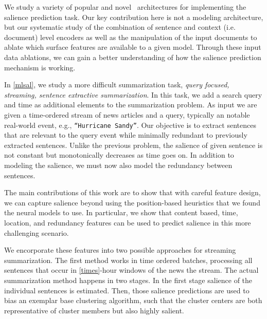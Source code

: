 
We study a variety of popular and novel \deeplearning~architectures for 
implementing the salience prediction task. Our key contribution here is not
a modeling architecture, but our systematic study of the combination of 
sentence and context (i.e. document) level encoders as well as the 
manipulation of the input documents to ablate which surface features are 
available to a given model. Through these input data ablations, we can gain
a better understanding of how the salience prediction mechanism is working.


In \autoref{mlsal}, we study a more difficult summarization task, 
\emph{query focused, streaming, sentence extractive summarization}. In this
task, we add a search query and time as additional elements to the 
summarization problem. As input we are given a time-ordered stream of news 
articles and a query, typically an notable real-world event, 
e.g., \texttt{``Hurricane Sandy''}. Our objective is to extract sentences that
are relevant to the query event while minimally redundant to previously 
extracted
sentences. Unlike the previous problem, the salience of given sentence 
is not constant but monotonically decreases as time goes on. In addition
to modeling the salience, we must now also model the redundancy between
sentences. 

The main contributions of this work are to show that with careful feature 
design, we can capture salience beyond using the position-based heuristics
that we found the neural models to use. In particular, we show that content
based, time, location, and redundancy features can be used to predict salience
in this more challenging scenario.

We encorporate these features into two possible approaches for streaming
summarization.
The first method works in time ordered batches, processing all sentences that 
occur in \autoref{times}-hour windows of the news the stream. The actual summarization method happens in two stages. In the first stage salience of the individual
sentences is estimated. Then, those salience predictions are used to bias
an exemplar base clustering algorithm, such that the cluster centers are both
representative of cluster members but also highly salient. 


